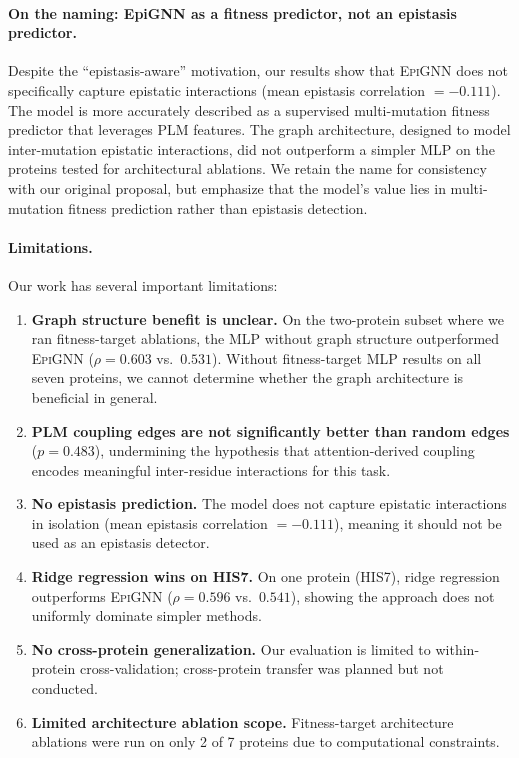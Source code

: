 \documentclass{article}
\newcommand{\epignn}{\textsc{EpiGNN}}
\begin{document}
\paragraph{On the naming: EpiGNN as a fitness predictor, not an epistasis predictor.}
Despite the ``epistasis-aware'' motivation, our results show that \epignn{} does not specifically capture epistatic interactions (mean epistasis correlation $= -0.111$).
The model is more accurately described as a supervised multi-mutation fitness predictor that leverages PLM features.
The graph architecture, designed to model inter-mutation epistatic interactions, did not outperform a simpler MLP on the proteins tested for architectural ablations.
We retain the name for consistency with our original proposal, but emphasize that the model's value lies in multi-mutation fitness prediction rather than epistasis detection.

\paragraph{Limitations.}
Our work has several important limitations:
\begin{enumerate}
    \item \textbf{Graph structure benefit is unclear.} On the two-protein subset where we ran fitness-target ablations, the MLP without graph structure outperformed \epignn{} ($\rho = 0.603$ vs.\ $0.531$). Without fitness-target MLP results on all seven proteins, we cannot determine whether the graph architecture is beneficial in general.
    \item \textbf{PLM coupling edges are not significantly better than random edges} ($p = 0.483$), undermining the hypothesis that attention-derived coupling encodes meaningful inter-residue interactions for this task.
    \item \textbf{No epistasis prediction.} The model does not capture epistatic interactions in isolation (mean epistasis correlation $= -0.111$), meaning it should not be used as an epistasis detector.
    \item \textbf{Ridge regression wins on HIS7.} On one protein (HIS7), ridge regression outperforms \epignn{} ($\rho = 0.596$ vs.\ $0.541$), showing the approach does not uniformly dominate simpler methods.
    \item \textbf{No cross-protein generalization.} Our evaluation is limited to within-protein cross-validation; cross-protein transfer was planned but not conducted.
    \item \textbf{Limited architecture ablation scope.} Fitness-target architecture ablations were run on only 2 of 7 proteins due to computational constraints.
\end{enumerate}
\end{document}
